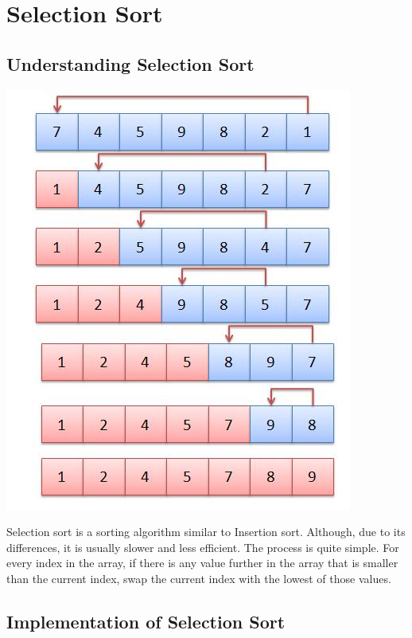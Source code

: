 \documentclass[letterpaper, 10pt]{article}
\begin{document}
\newpage
\section{Selection Sort}
\subsection{Understanding Selection Sort}
\begin{center}
\includegraphics[width=\textwidth / 2]{img/SelectionSort.jpg}
\end{center}

Selection sort is a sorting algorithm similar to Insertion sort. Although, due to its differences, it is usually slower and less efficient. The process is quite simple. For every index in the array, if there is any value further in the array that is smaller than the current index, swap the current index with the lowest of those values.

\subsection{Implementation of Selection Sort}
\end{document}
